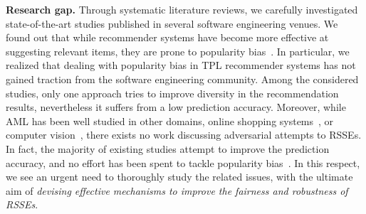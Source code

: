 

\textbf{Research gap.} %
Through systematic literature reviews, we carefully investigated state-of-the-art studies published in several software engineering venues. We found out that while recommender systems have become more effective at suggesting relevant items, they are prone to popularity bias~\cite{10174041}. %
In particular, we realized that dealing with popularity bias in TPL recommender systems has not gained traction from the software engineering community. Among the considered studies, only one approach tries to improve diversity in the recommendation results, nevertheless it suffers from a low prediction accuracy. Moreover, while AML has been well studied in other domains, \eg online shopping systems~\cite{10.1145/3336191.3371877,10.1007/s10462-012-9364-9}, or computer vision~\cite{conf/cvpr/NguyenYC15}, there exists no work discussing adversarial attempts to RSSEs. In fact, the majority of existing studies %
attempt to improve the prediction accuracy, and no effort has been spent to tackle popularity bias~\cite{10174041}. %
In this respect, we see an urgent need to thoroughly study the related issues, %
with the ultimate aim of \emph{devising effective mechanisms to improve the fairness and robustness of RSSEs}. 





